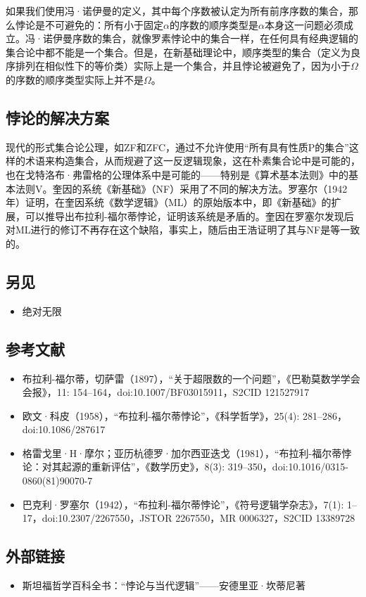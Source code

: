 如果我们使用冯·诺伊曼的定义，其中每个序数被认定为所有前序序数的集合，那么悖论是不可避免的：所有小于固定$\alpha$的序数的顺序类型是$\alpha$本身这一问题必须成立。冯·诺伊曼序数的集合，就像罗素悖论中的集合一样，在任何具有经典逻辑的集合论中都不能是一个集合。但是，在新基础理论中，顺序类型的集合（定义为良序排列在相似性下的等价类）实际上是一个集合，并且悖论被避免了，因为小于$\Omega$的序数的顺序类型实际上并不是$\Omega$。
\subsection{悖论的解决方案}
现代的形式集合论公理，如ZF和ZFC，通过不允许使用“所有具有性质P的集合”这样的术语来构造集合，从而规避了这一反逻辑现象，这在朴素集合论中是可能的，也在戈特洛布·弗雷格的公理体系中是可能的——特别是《算术基本法则》中的基本法则V。奎因的系统《新基础》（NF）采用了不同的解决方法。罗塞尔（1942年）证明，在奎因系统《数学逻辑》（ML）的原始版本中，即《新基础》的扩展，可以推导出布拉利-福尔蒂悖论，证明该系统是矛盾的。奎因在罗塞尔发现后对ML进行的修订不再存在这个缺陷，事实上，随后由王浩证明了其与NF是等一致的。
\subsection{另见}
\begin{itemize}
\item 绝对无限
\end{itemize}
\subsection{参考文献}
\begin{itemize}
\item 布拉利-福尔蒂，切萨雷（1897），“关于超限数的一个问题”，《巴勒莫数学学会会报》，11: 154–164，doi:10.1007/BF03015911，S2CID 121527917
\item 欧文·科皮（1958），“布拉利-福尔蒂悖论”，《科学哲学》，25(4): 281–286，doi:10.1086/287617
\item 格雷戈里·H·摩尔；亚历杭德罗·加尔西亚迭戈（1981），“布拉利-福尔蒂悖论：对其起源的重新评估”，《数学历史》，8(3): 319–350，doi:10.1016/0315-0860(81)90070-7
\item 巴克利·罗塞尔（1942），“布拉利-福尔蒂悖论”，《符号逻辑学杂志》，7(1): 1–17，doi:10.2307/2267550，JSTOR 2267550，MR 0006327，S2CID 13389728
\end{itemize}
\subsection{外部链接}
\begin{itemize}
\item 斯坦福哲学百科全书：“悖论与当代逻辑”——安德里亚·坎蒂尼著
\end{itemize}
